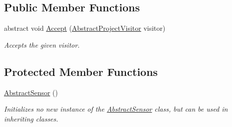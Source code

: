 \subsection*{Public Member Functions}
\begin{DoxyCompactItemize}
\item 
abstract void \hyperlink{class_a_rdev_kit_1_1_model_1_1_project_1_1_abstract_sensor_a4ff825b76bdd9f01a93ca670d02c219c}{Accept} (\hyperlink{class_a_rdev_kit_1_1_controller_1_1_project_controller_1_1_abstract_project_visitor}{Abstract\-Project\-Visitor} visitor)
\begin{DoxyCompactList}\small\item\em Accepts the given visitor. \end{DoxyCompactList}\end{DoxyCompactItemize}
\subsection*{Protected Member Functions}
\begin{DoxyCompactItemize}
\item 
\hyperlink{class_a_rdev_kit_1_1_model_1_1_project_1_1_abstract_sensor_ac267c5a8c7792a6c0ba07108102c0706}{Abstract\-Sensor} ()
\begin{DoxyCompactList}\small\item\em Initializes no new instance of the \hyperlink{class_a_rdev_kit_1_1_model_1_1_project_1_1_abstract_sensor}{Abstract\-Sensor} class, but can be used in inheriting classes. \end{DoxyCompactList}\end{DoxyCompactItemize}
